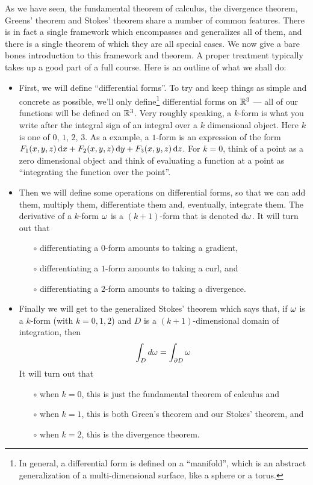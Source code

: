 As we have seen, the fundamental theorem of calculus, 
the divergence theorem, Greens' theorem and Stokes' theorem
share a number of common features. There is in fact a single framework 
which encompasses and generalizes all of them, and there is a 
single theorem of which they are all special cases. We now give a 
bare bones introduction to this framework and theorem. A proper 
treatment typically takes up a good part of a full course. 
Here is an outline of what we shall do:
\begin{itemize}
\item
First, we will define ``differential forms''. To try and keep 
things as simple and concrete as possible, we'll only define\footnote{In 
general, a differential form is defined on a ``manifold'', which is 
an abstract generalization of a multi-dimensional surface, like a sphere or a torus.} 
differential forms on $\mathbb{R}^3$ --- all of our functions will be defined on
$\mathbb{R}^3$. Very roughly
speaking, a $k$-form is what you write after the integral sign of 
an integral over a $k$ dimensional object. Here $k$ is one of $0$, $1$, 
$2$, $3$.  As a example, a $1$-form is an expression of the
form $F_1(x,y,z)\,\mathrm{d}x
 + F_2(x,y,z)\,\mathrm{d}y
 + F_3(x,y,z)\,\mathrm{d}z$. For $k=0$, think of a point as a zero 
dimensional object and think of evaluating a function at a point 
as ``integrating the function over the point''.

\item
Then we will define some operations on differential forms, so that 
we can add them, multiply them, differentiate them and, eventually,
integrate them.  The derivative of 
a $k$-form $\omega$ is a $(k+1)$-form that is denoted $\mathrm{d}\omega$.
It will turn out that 
\begin{itemize}\itemsep1pt \parskip0pt  %
\item[$\circ$]
differentiating a $0$-form amounts to taking a gradient,
\item[$\circ$]
differentiating a $1$-form amounts to taking a curl, and
\item[$\circ$]
differentiating a $2$-form amounts to taking a divergence.
\end{itemize}

\item
Finally we will get to the generalized Stokes' theorem which says that,
if $\omega$ is a $k$-form (with $k=0,1,2$) and $D$ is a $(k+1)$-dimensional
domain of integration, then
\begin{equation*}
\int_D d\omega=\int_{\partial D}\omega
\end{equation*}
It will turn out that 
\begin{itemize}\itemsep1pt \parskip0pt  %
\item[$\circ$]
when $k=0$, this is just the fundamental theorem of calculus and
\item[$\circ$]
when $k=1$, this is both Green's theorem and our Stokes' theorem, and
\item[$\circ$]
when $k=2$, this is the divergence theorem.
\end{itemize}
\end{itemize} 

